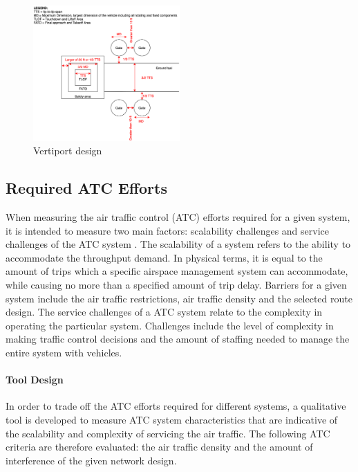 \begin{figure}[H]
    \centering
    \includegraphics[width=0.5\textwidth]{Figures/Vertiport_design.png}
    \captionsetup{justification=centering}
    \caption{Vertiport design}
    \label{fig:vertiport}
\end{figure}









\subsection{Required ATC Efforts}
When measuring the air traffic control (ATC) efforts required for a given system, it is intended to measure two main factors: scalability challenges and service challenges of the ATC system \cite{ATC}. The scalability of a system refers to the ability to accommodate the throughput demand. In physical terms, it is equal to the amount of trips which a specific airspace management system can accommodate, while causing no more than a specified amount of trip delay. Barriers for a given system include the air traffic restrictions, air traffic density and the selected route design.
The service challenges of a ATC system relate to the complexity in operating the particular system. Challenges include the level of complexity in making traffic control decisions and the amount of staffing needed to manage the entire system with vehicles.

\paragraph{Tool Design}
In order to trade off the ATC efforts required for different systems, a qualitative tool is developed to measure ATC system characteristics that are indicative of the scalability and complexity of servicing the air traffic. The following ATC criteria are therefore evaluated: the air traffic density and the amount of interference of the given network design. \\

